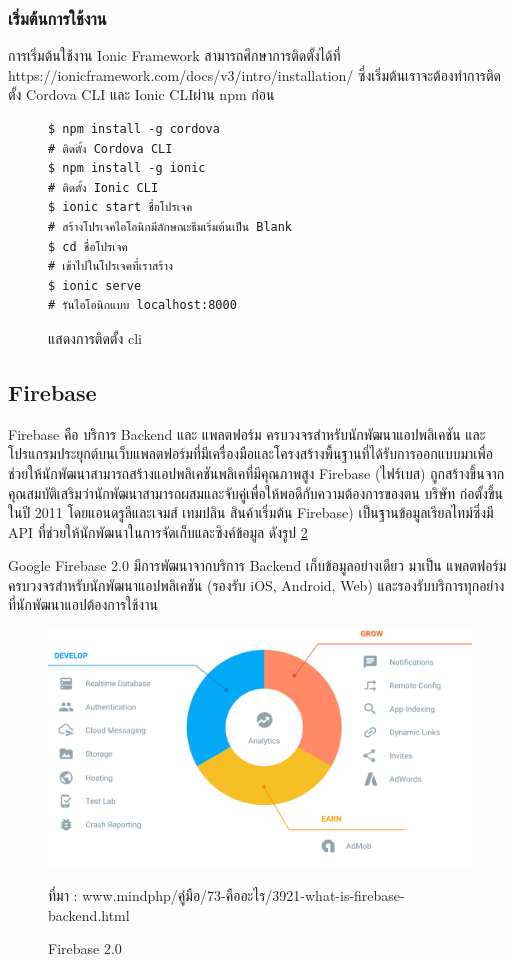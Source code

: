 		\subsubsection{ เริ่มต้นการใช้งาน}
		การเริ่มต้นใช้งาน Ionic Framework สามารถศึกษาการติดตั้งได้ที่ https://ionicframework.com/docs/v3/intro/installation/ ซี่งเริ่มต้นเราจะต้องทำการติดตั้ง Cordova CLI และ Ionic CLIผ่าน npm ก่อน
		\begin{figure}[H]
			{\begin{lstlisting}
$ npm install -g cordova 
# ติดตั้ง Cordova CLI
$ npm install -g ionic 
# ติดตั้ง Ionic CLI
$ ionic start ชื่อโปรเจค
# สร้างโปรเจคไอโอนิกมีลักษณะธีมเริ่มต้นเป็น Blank
$ cd ชื่อโปรเจค
# เข้าไปในโปรเจคที่เราสร้าง
$ ionic serve
# รันไอโอนิกแบบ localhost:8000
				\end{lstlisting}}
			\centering
			\caption{แสดงการติดตั้ง cli}
			\label{Fig:moment}
		\end{figure}



\subsection{Firebase}
	Firebase \cite{firebase} คือ บริการ Backend และ แพลตฟอร์ม ครบวงจรสำหรับนักพัฒนาแอปพลิเคชัน และโปรแกรมประยุกต์บนเว็บแพลตฟอร์มที่มีเครื่องมือและโครงสร้างพื้นฐานที่ได้รับการออกแบบมาเพื่อช่วยให้นักพัฒนาสามารถสร้างแอปพลิเคชันพลิเคที่มีคุณภาพสูง Firebase (ไฟร์เบส) ถูกสร้างขึ้นจากคุณสมบัติเสริมว่านักพัฒนาสามารถผสมและจับคู่เพื่อให้พอดีกับความต้องการของตน บริษัท ก่อตั้งขึ้นในปี 2011 โดยแอนดรูลีและเจมส์ เทมปลิน สินค้าเริ่มต้น Firebase) เป็นฐานข้อมูลเรียลไทม์ซึ่งมี API ที่ช่วยให้นักพัฒนาในการจัดเก็บและซิงค์ข้อมูล ดังรูป \ref{Fig:class1}
	
	Google Firebase 2.0 มีการพัฒนาจากบริการ Backend เก็บข้อมูลอย่างเดียว มาเป็น แพลตฟอร์มครบวงจรสำหรับนักพัฒนาแอปพลิเคชัน (รองรับ iOS, Android, Web) และรองรับบริการทุกอย่างที่นักพัฒนาแอปต้องการใช้งาน
	
	\begin{figure}[H]
		\centering
		\includegraphics[width=\columnwidth]{Figures/2/firebase}
		\caption{Firebase 2.0}{ที่มา : www.mindphp/คู่มือ/73-คืออะไร/3921-what-is-firebase-backend.html}
		\label{Fig:class1}
	\end{figure}

